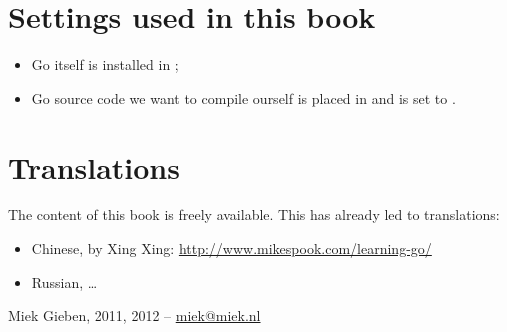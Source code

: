\section*{Settings used in this book}
\begin{itemize}
\item Go itself is installed in  ;
\item Go source code we want to compile ourself is placed in  and
 is set to  .
\end{itemize}

\section*{Translations}
The content of this book is freely available. This has already led to translations:
\begin{itemize}
\item Chinese, by Xing Xing: \url{http://www.mikespook.com/learning-go/}
\item Russian, \ldots
\end{itemize}

\begin{flushright}
Miek Gieben, 2011, 2012 -- \url{miek@miek.nl}
\end{flushright}
